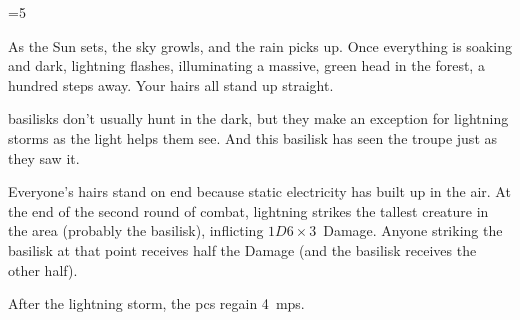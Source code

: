 \ifnum\value{cycle}=5

\begin{boxtext}
  As the Sun sets, the sky growls, and the rain picks up.
  Once everything is soaking and dark, lightning flashes, illuminating a massive, green head in the forest, a hundred \glspl{step} away.
  Your hairs all stand up straight.
\end{boxtext}

\Glspl{basilisk} don't usually hunt in the dark, but they make an exception for lightning storms as the light helps them see.
And this \gls{basilisk} has seen the troupe just as they saw it.

Everyone's hairs stand on end because static electricity has built up in the air.
At the end of the second \gls{round} of combat, lightning strikes the tallest creature in the area (probably the \gls{basilisk}), inflicting $1D6\times 3$~Damage.
Anyone striking the \gls{basilisk} at that point receives half the Damage (and the \gls{basilisk} receives the other half).

\basilisk

After the lightning storm, the \glspl{pc} regain 4~\glspl{mp}.

\fi
